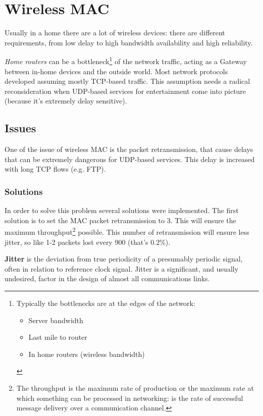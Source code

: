 \chapter{Wireless MAC}


Usually in a home there are a lot of wireless devices: there are different
requirements, from low delay to high bandwidth availability and high
reliability.

\textit{Home routers} can be a bottleneck\footnote{
  Typically the bottlenecks are at the edges of the network:
  \begin{itemize}
  \item Server bandwidth
  \item Last mile to router
  \item In home routers (wireless bandwidth)
  \end{itemize}
}
of the network traffic, acting as a Gateway between in-home devices and the
outside world.
Most network protocols developed assuming mostly TCP-based traffic. This
assumption needs a radical reconsideration when UDP-based services for
entertainment come into picture (because it's extremely delay sensitive).

\section{Issues}

One of the issue of wireless MAC is the packet retransmission, that cause delays
that can be extremely dangerous for UDP-based services. This delay is increased
with long TCP flows (e.g. FTP).

\subsection{Solutions}

In order to solve this problem several solutions were implemented. The first
solution is to set the MAC packet retransmission to 3. This will ensure the
maximum throughput\footnote{
  The throughput is the maximum rate of production or the maximum rate at which
  something can be processed in networking: is the rate of successful message
  delivery over a communication channel.
}
possible. This number of retransmission will ensure less jitter, so like 1-2
packets lost every 900 (that's 0.2\%).

\textbf{Jitter} is the deviation from true periodicity of a presumably
periodic signal, often in relation to reference clock signal. Jitter is a
significant, and usually undesired, factor in the design of almost all
communications links.

